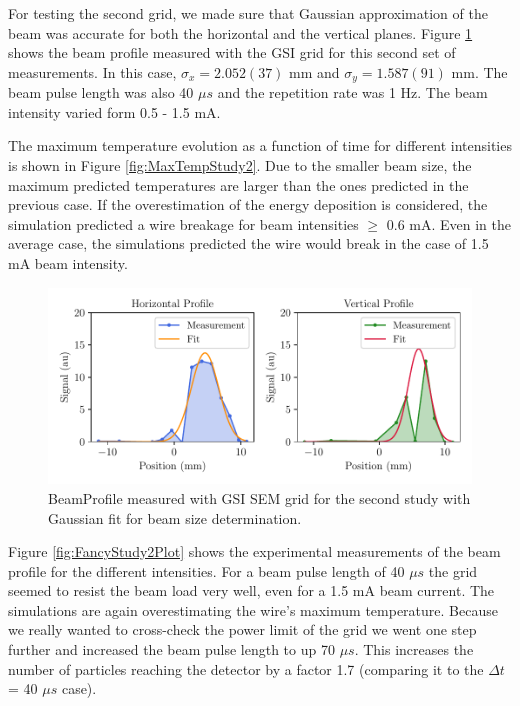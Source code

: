 For testing the second grid, we made sure that Gaussian approximation of the beam was accurate for both the horizontal and the vertical planes. Figure \ref{fig:BeamProfileStudy2} shows the beam profile measured with the GSI grid for this second set of measurements. In this case, $\sigma_x = 2.052(37)$ mm and $\sigma_y = 1.587(91)$ mm. The beam pulse length was also 40 $\mu s$ and the repetition rate was 1 Hz. The beam intensity varied form 0.5 - 1.5 mA. 

The maximum temperature evolution as a function of time for different intensities is shown in Figure \ref{fig:MaxTempStudy2}. Due to the smaller beam size, the maximum predicted temperatures are larger than the ones predicted in the previous case. If the overestimation of the energy deposition is considered, the simulation predicted a wire breakage for beam intensities $\geq$ 0.6 mA. Even in the average case, the simulations predicted the wire would break in the case of 1.5 mA beam intensity.

\begin{figure}[h]
    \centering
    \includegraphics[width=1.0\columnwidth]{BeamSizeStudy2/BeamProfileMeasurement2.pdf}
    \caption{BeamProfile measured with GSI SEM grid for the second study with Gaussian fit for beam size determination.}
    \label{fig:BeamProfileStudy2}
\end{figure}

Figure \ref{fig:FancyStudy2Plot} shows the experimental measurements of the beam profile for the different intensities. For a beam pulse length of 40 $\mu s$ the grid seemed to resist the beam load very well,  even for a 1.5 mA beam current. The simulations are again overestimating the wire's maximum temperature. Because we really wanted to cross-check the power limit of the grid we went one step further and increased the beam pulse length to up 70 $\mu s$. This increases the number of particles reaching the detector by a factor 1.7 (comparing it to the $\Delta t$ = 40 $\mu s$ case). 

